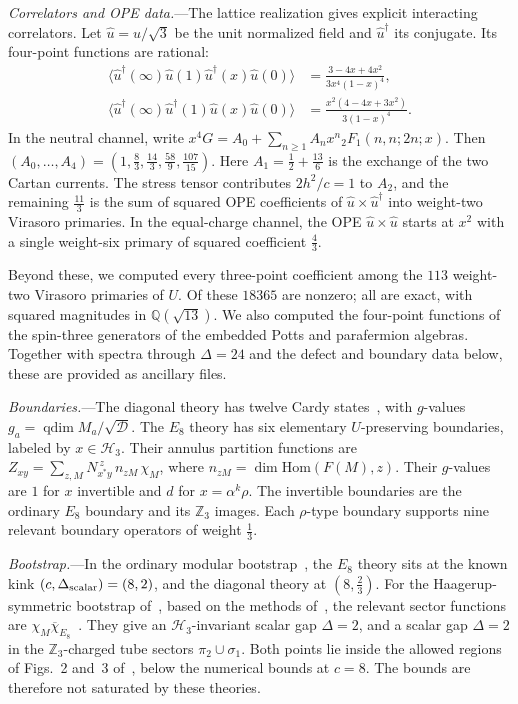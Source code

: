 \documentclass[aps,prl,twocolumn,superscriptaddress,nofootinbib]{revtex4-2}
\newcommand{\cH}{\mathcal H}
\newcommand{\qdim}{\operatorname{qdim}}
\newcommand{\VE}{\overline{\chi}_{E_8}}
\begin{document}
\textit{Correlators and OPE data.}---The lattice realization gives
explicit interacting correlators. Let $\hat u=u/\sqrt3$ be the unit
normalized field and $\hat u^\dagger$ its conjugate. Its four-point
functions are rational:
\begin{align}
 \langle\hat u^\dagger(\infty)\hat u(1)\hat u^\dagger(x)\hat u(0)\rangle
 &=\frac{3-4x+4x^2}{3x^4(1-x)^4},\label{eq:G0}\\
 \langle\hat u^\dagger(\infty)\hat u^\dagger(1)\hat u(x)\hat u(0)\rangle
 &=\frac{x^2(4-4x+3x^2)}{3(1-x)^4}.\label{eq:Gp}
\end{align}
In the neutral channel, write
$x^4G=A_0+\sum_{n\ge1}A_nx^n{}_2F_1(n,n;2n;x)$.
Then
$(A_0,\dots,A_4)=(1,\tfrac83,\tfrac{14}3,\tfrac{58}9,\tfrac{107}{15})$.
Here $A_1=\tfrac12+\tfrac{13}6$ is the exchange of the two Cartan
currents. The stress tensor contributes $2h^2/c=1$ to $A_2$, and the
remaining $\tfrac{11}3$ is the sum of squared OPE coefficients of
$\hat u\times\hat u^\dagger$ into weight-two Virasoro primaries. In the
equal-charge channel, the OPE $\hat u\times\hat u$ starts at $x^2$ with a
single weight-six primary of squared coefficient $\tfrac43$.

Beyond these, we computed every three-point coefficient among the $113$
weight-two Virasoro primaries of $U$. Of these $18365$ are nonzero; all
are exact, with squared magnitudes in $\mathbb Q(\sqrt{13})$. We also
computed the four-point functions of the spin-three generators of the
embedded Potts and parafermion algebras. Together with spectra through
$\Delta=24$ and the defect and boundary data below, these are provided
as ancillary files.

\textit{Boundaries.}---The diagonal theory has twelve Cardy
states~\cite{Cardy}, with $g$-values
$g_a=\qdim M_a/\sqrt{\mathcal D}$. The $E_8$ theory has six elementary
$U$-preserving boundaries, labeled by $x\in\cH_3$. Their annulus
partition functions are
$Z_{xy}=\sum_{z,M}N_{x^*y}^{\ z}\,n_{zM}\,\chi_M$, where
$n_{zM}=\dim\mathrm{Hom}(F(M),z)$. Their $g$-values are $1$ for $x$
invertible and $d$ for $x=\alpha^k\rho$. The invertible boundaries are
the ordinary $E_8$ boundary and its $\mathbb Z_3$ images. Each
$\rho$-type boundary supports nine relevant boundary operators of
weight $\tfrac13$.

\textit{Bootstrap.}---In the ordinary modular bootstrap~\cite{CLY}, the
$E_8$ theory sits at the known kink $(c,\Delta_{\rm scalar})=(8,2)$,
and the diagonal theory at $(8,\tfrac23)$. For the Haagerup-symmetric bootstrap
of~\cite{AHKZ}, based on the methods of~\cite{LS19,LS23}, the relevant sector functions are
$\chi_M\VE$~\cite{note-bootstrap}. They give an $\cH_3$-invariant
scalar gap $\Delta=2$, and a scalar gap $\Delta=2$ in the
$\mathbb Z_3$-charged tube sectors $\pi_2\cup\sigma_1$. Both points lie
inside the allowed regions of Figs.~2 and~3 of~\cite{AHKZ}, below the
numerical bounds at $c=8$. The bounds are therefore not saturated by
these theories.
\end{document}
